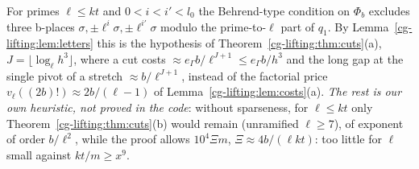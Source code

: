 \begin{remark}\label{cg-lifting:rem:sparse}
For primes $\ell\le kt$ and $0<i<i'<l_0$ the Behrend-type condition on $\Phi_b$ excludes three
b-places $\sigma,\pm\ell^i\sigma,\pm\ell^{i'}\sigma$ modulo the prime-to-$\ell$ part of $q_1$. By
Lemma~\ref{cg-lifting:lem:letters} this is the hypothesis of Theorem~\ref{cg-lifting:thm:cuts}(a),
$J=\lfloor\log_\ell h^3\rfloor$, where a cut costs $\approx e_\Gamma b/\ell^{J+1}\le e_\Gamma b/h^3$ and the long gap at the single pivot of a
stretch $\approx b/\ell^{J+1}$, instead of the factorial price $v_\ell((2b)!)\approx2b/(\ell-1)$ of
Lemma~\ref{cg-lifting:lem:costs}(a). \emph{The rest is our own
heuristic, not proved in the code}: without sparseness, for $\ell\le kt$ only Theorem~\ref{cg-lifting:thm:cuts}(b) would remain (unramified $\ell\ge7$), of exponent of order $b/\ell^2$, while the proof allows
$10^4\Xi m$, $\Xi\approx4b/(\ell kt)$: too little for $\ell$ small against $kt/m\ge x^9$.
\end{remark}
